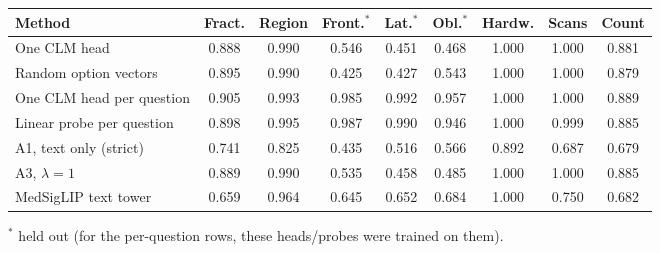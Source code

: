 \documentclass[11pt]{article}
\begin{document}
\begin{table}[!h]
  \centering\small
  \begin{tabular}{lcccccccc}
    \toprule
    Method & Fract. & Region & Front.$^{*}$ & Lat.$^{*}$ & Obl.$^{*}$ & Hardw. & Scans & Count \\
    \midrule
    One CLM head & 0.888 & 0.990 & 0.546 & 0.451 & 0.468 & 1.000 & 1.000 & 0.881 \\
    Random option vectors & 0.895 & 0.990 & 0.425 & 0.427 & 0.543 & 1.000 & 1.000 & 0.879 \\
    One CLM head per question & 0.905 & 0.993 & 0.985 & 0.992 & 0.957 & 1.000 & 1.000 & 0.889 \\
    Linear probe per question & 0.898 & 0.995 & 0.987 & 0.990 & 0.946 & 1.000 & 0.999 & 0.885 \\
    A1, text only (strict) & 0.741 & 0.825 & 0.435 & 0.516 & 0.566 & 0.892 & 0.687 & 0.679 \\
    A3, $\lambda=1$ & 0.889 & 0.990 & 0.535 & 0.458 & 0.485 & 1.000 & 1.000 & 0.885 \\
    MedSigLIP text tower & 0.659 & 0.964 & 0.645 & 0.652 & 0.684 & 1.000 & 0.750 & 0.682 \\
    \bottomrule
  \end{tabular}

  \smallskip
  {\footnotesize $^{*}$ held out (for the per-question rows, these heads/probes were trained on them).}
\end{table}
\end{document}
